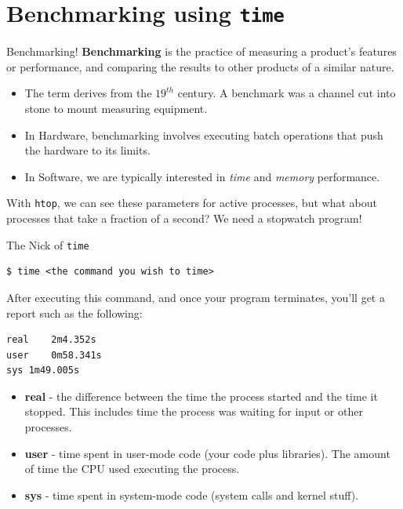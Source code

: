 \documentclass[11pt]{beamer}
\begin{document}
\section[time]{Benchmarking using \texttt{time}}
\begin{frame}{Benchmarking!}
\textbf{Benchmarking} is the practice of measuring a product's features or performance, and comparing the results to other products of a similar nature.
\begin{itemize}
\item The term derives from the $19^{th}$ century.  A benchmark was a channel cut into stone to mount measuring equipment.
\item In Hardware, benchmarking involves executing batch operations that push the hardware to its limits.
\item In Software, we are typically interested in \emph{time} and \emph{memory} performance.  
\end{itemize}
With \texttt{htop}, we can see these parameters for active processes, but what about processes that take a fraction of a second?  We need a stopwatch program! 
\end{frame}

\begin{frame}[fragile=singleslide]{The Nick of \texttt{time}}
\begin{lstlisting}[style=terminal]
$ time <the command you wish to time>
\end{lstlisting}
After executing this command, and once your program terminates, you'll get a report such as the following:
\begin{lstlisting}[style=terminal]
real	2m4.352s
user	0m58.341s
sys	1m49.005s
\end{lstlisting}
\begin{itemize}
\item \textbf{real} - the difference between the time the process started and the time it stopped.  This includes time the process was waiting for input or other processes.
\item \textbf{user} - time spent in user-mode code (your code plus libraries).  The amount of time the CPU used executing the process.  
\item \textbf{sys} - time spent in system-mode code (system calls and kernel stuff). 
\end{itemize}
\end{frame}
\end{document}
